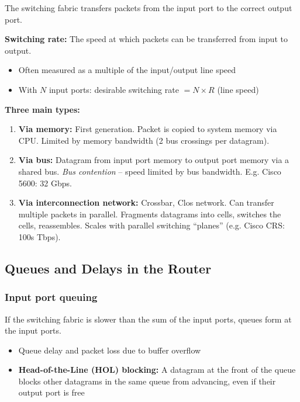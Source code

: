 \begin{keybox}
The switching fabric transfers packets from the input port to the correct output port.

\textbf{Switching rate:} The speed at which packets can be transferred from input to output.
\begin{itemize}[noitemsep]
    \item Often measured as a multiple of the input/output line speed
    \item With $N$ input ports: desirable switching rate $= N \times R$ (line speed)
\end{itemize}

\textbf{Three main types:}
\begin{enumerate}[noitemsep]
    \item \textbf{Via memory:} First generation. Packet is copied to system memory via CPU. Limited by memory bandwidth (2 bus crossings per datagram).
    \item \textbf{Via bus:} Datagram from input port memory to output port memory via a shared bus. \emph{Bus contention} -- speed limited by bus bandwidth. E.g. Cisco 5600: 32 Gbps.
    \item \textbf{Via interconnection network:} Crossbar, Clos network. Can transfer multiple packets in parallel. Fragments datagrams into cells, switches the cells, reassembles. Scales with parallel switching ``planes'' (e.g. Cisco CRS: 100s Tbps).
\end{enumerate}
\end{keybox}

\subsection{Queues and Delays in the Router}

\subsubsection{Input port queuing}

\begin{keybox}
If the switching fabric is slower than the sum of the input ports, queues form at the input ports.
\begin{itemize}[noitemsep]
    \item Queue delay and packet loss due to buffer overflow
    \item \textbf{Head-of-the-Line (HOL) blocking:} A datagram at the front of the queue blocks other datagrams in the same queue from advancing, even if their output port is free
\end{itemize}
\end{keybox}

